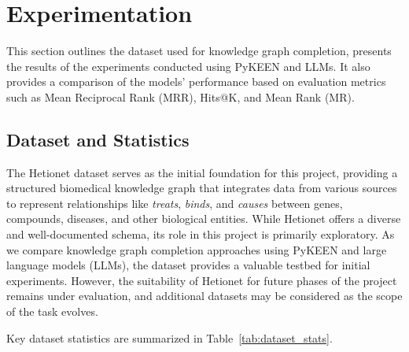 \section*{Experimentation}


This section outlines the dataset used for knowledge graph completion, presents the results of the experiments conducted using PyKEEN and LLMs. It also provides a comparison of the models' performance based on evaluation metrics such as Mean Reciprocal Rank (MRR), Hits@K, and Mean Rank (MR).

\subsection*{Dataset and Statistics}


The Hetionet dataset \cite{hetionet} serves as the initial foundation for this project, providing a structured biomedical knowledge graph that integrates data from various sources to represent relationships like \textit{treats}, \textit{binds}, and \textit{causes} between genes, compounds, diseases, and other biological entities. While Hetionet offers a diverse and well-documented schema, its role in this project is primarily exploratory. As we compare knowledge graph completion approaches using PyKEEN and large language models (LLMs), the dataset provides a valuable testbed for initial experiments. However, the suitability of Hetionet for future phases of the project remains under evaluation, and additional datasets may be considered as the scope of the task evolves. 

Key dataset statistics are summarized in Table~\ref{tab:dataset_stats}.

